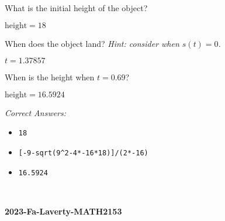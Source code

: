 \documentclass[11pt]{amsart}
\newcommand{\nocolumns}{}
\begin{document}
\begin{multicols}{2}
{{
 What is the initial height of the object?

{
  \(\text{height} = 18\)
\par}%

 When does the object land? {\itshape{}Hint: consider when \(s(t) = 0\).}

{
  \(t = {1.37857}\)
\par}%

 When is the height when \(t = 0.69\)?
{
  \(\text{height} = {16.5924}\)
\par}%
\par}%

\par}%
\par 
\par{\small{\it Correct Answers:}
\vspace{-\parskip}\begin{itemize}
\item\begin{verbatim}18\end{verbatim}
\item\begin{verbatim}[-9-sqrt(9^2-4*-16*18)]/(2*-16)\end{verbatim}
\item\begin{verbatim}16.5924\end{verbatim}
\end{itemize}}\par
\leavevmode\\\relax 
{}



\newpage%
\setcounter{page}{1}%

\ifdefined\nocolumns\else \end{multicols}\fi

\hfill
{\large \bf {2023-Fa-Laverty-MATH2153}}
\par
{}
\par\noindent \bigskip
\end{document}
